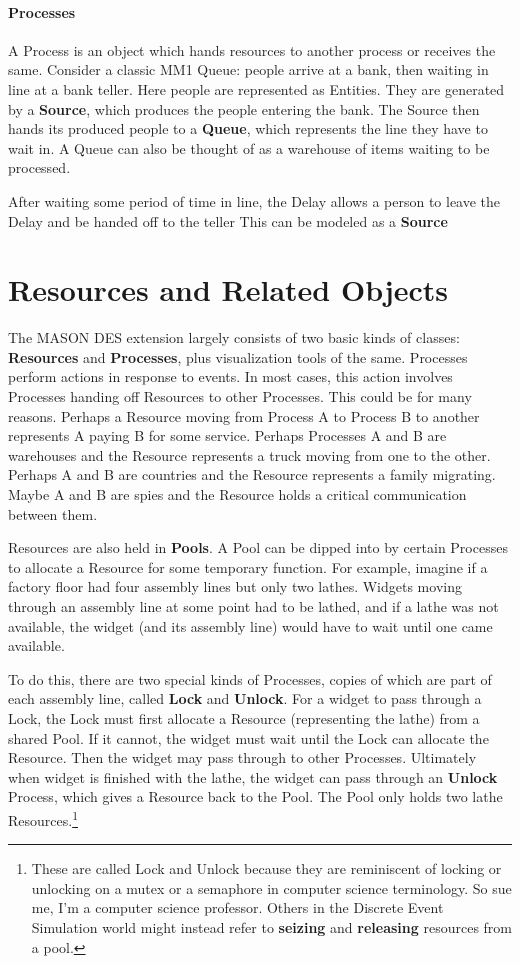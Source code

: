 \documentclass[twoside,10pt]{article}
\begin{document}
\paragraph{Processes}  A Process is an object which hands resources to another process or receives the same.  Consider a classic MM1 Queue: people arrive at a bank, then waiting in line at a bank teller.  Here people are represented as Entities.  They are generated by a {\bf Source}, which produces the people entering the bank. The Source then hands its produced people to a {\bf Queue}, which represents the line they have to wait in.  A Queue can also be thought of as a warehouse of items waiting to be processed.  

  After waiting some period of time in line, the Delay allows a person to leave the Delay and be handed off to the teller   This can be modeled as a {\bf Source} 

\section{Resources and Related Objects}

The MASON DES extension largely consists of two basic kinds of classes:  {\bf Resources} and {\bf Processes}, plus visualization tools of the same.   Processes perform actions in response to events.  In most cases, this action involves Processes handing off Resources to other Processes.  This could be for many reasons.  Perhaps a Resource moving from Process A to Process B to another represents A paying B for some service.  Perhaps Processes A and B are warehouses and the Resource represents a truck moving from one to the other.  Perhaps A and B are countries and the Resource represents a family migrating.  Maybe A and B are spies and the Resource holds a critical communication between them.

Resources are also held in {\bf Pools}.  A Pool can be dipped into by certain Processes to allocate a Resource for some temporary function.  For example, imagine if a factory floor had four assembly lines but only two lathes.  Widgets moving through an assembly line at some point had to be lathed, and if a lathe was not available, the widget (and its assembly line) would have to wait until one came available.

To do this, there are two special kinds of Processes, copies of which are part of each assembly line, called {\bf Lock} and {\bf Unlock}.  For a widget to pass through a Lock, the Lock must first allocate a Resource (representing the lathe) from a shared Pool.  If it cannot, the widget must wait until the Lock can allocate the Resource.  Then the widget may pass through to other Processes.  Ultimately when widget is finished with the lathe, the widget can pass through an {\bf Unlock} Process, which gives a Resource back to the Pool.   The Pool only holds two lathe Resources.\footnote{These are called Lock and Unlock because they are reminiscent of locking or unlocking on a mutex or a semaphore in computer science terminology.   So sue me, I'm a computer science professor. Others in the Discrete Event Simulation world might instead refer to {\bf seizing} and {\bf releasing} resources from a pool.}
\end{document}

